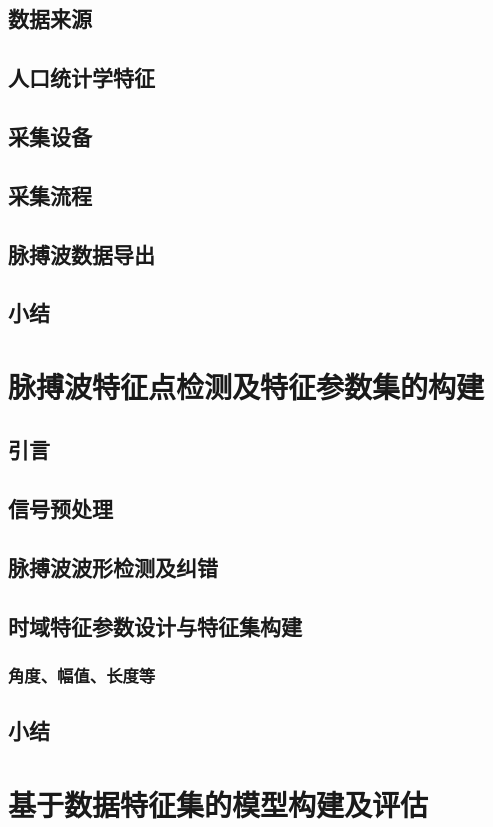\section{数据来源}
\section{人口统计学特征}
\section{采集设备}
\section{采集流程}
\section{脉搏波数据导出}
\section{小结}


\chapter{脉搏波特征点检测及特征参数集的构建}
\section{引言}
\section{信号预处理}
\section{脉搏波波形检测及纠错}
\section{时域特征参数设计与特征集构建}
\subsection{角度、幅值、长度等}
\section{小结}

\chapter{基于数据特征集的模型构建及评估}
